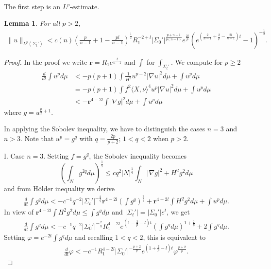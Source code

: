 \documentclass[12pt,twoside]{article}
\theoremstyle{plain}
\newtheorem{lem}[theorem]{Lemma}
\theoremstyle{definition}
\theoremstyle{remark}
\newcommand{\vphi}{\varphi}
\newcommand{\na}{\nabla}
\newcommand{\lt}{\left}
\newcommand{\rt}{\right}
\newcommand{\mr}{\mathbf{r}}
\numberwithin{equation}{section}
\begin{document}
The first step is an $L^p$-estimate.
\begin{lem}\label{Lp}
For all $p > 2$,
\begin{align*}
\| u\|_{L^p(\Sigma_t')} < c(n) (\frac{p}{n-1}+1 - \frac{pl}{n-1})^{\frac{1}{2}}  R_1^{-2+l} |\Sigma_0'|^{\frac{p+n-1}{p(n-1)}} e^{\frac{2t}{p}} \lt( e^{(\frac{2}{n-1}+\frac{2}{p} - \frac{2l}{n-1})t} - 1 \rt)^{-\frac{1}{2}}.
\end{align*}
\end{lem}
\begin{proof} In the proof we write $\mr = R_1 e^{\frac{t}{n-1}}$ and $\int$ for $\int_{\Sigma_t'}$. We compute for $p \ge 2$
\begin{align*}
\frac{d}{dt} \int u^p d\mu &< -p(p+1) \int \frac{1}{H^2} u^{p-2} |\na u|^2 d\mu + \int u^p d\mu \\
&= -p(p+1) \int f^2 \langle X,\nu \rangle^4	 u^{p} |\na u|^2 d\mu + \int u^p d\mu \\
&< - \mr^{4-2l} \int |\na g|^2 d\mu + \int u^p d\mu
\end{align*}
where $g = u^{\frac{p}{2}+1}$.

In applying the Sobolev inequality, we have to distinguish the cases $n=3$ and $n >3$. Note that $u^p = g^q$ with $q = \frac{2p}{p+2}$; $1< q < 2$ when $p > 2$. 

I. Case $n=3$. Setting $f = g^q$, the Sobolev inequality becomes 
\[ \lt( \int_{N} g^{2q} d\mu \rt)^{\frac{1}{q}} \le cq^2 |N|^{\frac{1}{q}} \int_{N} |\na g|^2 + H^2 g^2 d\mu \] and from H\"older inequality we derive
\begin{align*}
\frac{d}{dt} \int g^q d\mu < -c^{-1}q^{-2} |\Sigma_t'|^{-\frac{2}{q}} \mr^{4-2l} \lt( \int g^q \rt)^{\frac{2}{q}} + \mr^{4-2l} \int H^2 g^2 d\mu + \int u^p d\mu.
\end{align*}
In view of $\mr^{4-2l} \int H^2 g^2 d\mu \le \int g^q d\mu$ and $|\Sigma_t'| = |\Sigma_0'| e^t$, we get
\begin{align*}
\frac{d}{dt} \int g^q d\mu < -c^{-1} q^{-2} |\Sigma_0'|^{-\frac{2}{q}} R_1^{4-2l} e^{(1-\frac{2}{p} - l)t} \lt( \int g^q d\mu \rt)^{1+\frac{2}{p}} + 2 \int g^q d\mu.
\end{align*} 
Setting $\vphi = e^{-2t} \int g^q d\mu$ and recalling $1 < q < 2$, this is equivalent to
\begin{align*}
\frac{d}{dt} \vphi < -c^{-1} R_1^{4-2l} |\Sigma_0'|^{-\frac{p+2}{p}} e^{(1+\frac{2}{p} - l)t} \vphi^{\frac{p+2}{p}}.
\end{align*}


\end{proof}
\end{document}

